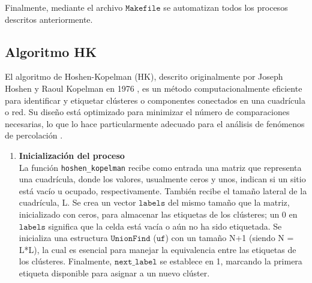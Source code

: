 \documentclass[12pt,a4paper]{article}
\begin{document}
Finalmente, mediante el archivo $\texttt{Makefile}$ se automatizan todos los procesos descritos anteriormente.

\subsection{Algoritmo HK}
El algoritmo de Hoshen-Kopelman (HK), descrito originalmente por Joseph Hoshen y Raoul Kopelman en 1976 , es un método computacionalmente eficiente para identificar y etiquetar clústeres o componentes conectados en una cuadrícula o red. Su diseño está optimizado para minimizar el número de comparaciones necesarias, lo que lo hace particularmente adecuado para el análisis de fenómenos de percolación \cite{OntosightAINd}.

\begin{enumerate}[label=\textbf{\arabic*)}, ref=\arabic*)]
    \item \textbf{Inicialización del proceso}\\
    La función \texttt{hoshen\_kopelman} recibe como entrada una matriz que representa una cuadrícula, donde los valores, usualmente ceros y unos, indican si un sitio está vacío u ocupado, respectivamente. También recibe el tamaño lateral de la cuadrícula, L. Se crea un vector $\texttt{labels}$ del mismo tamaño que la matriz, inicializado con ceros, para almacenar las etiquetas de los clústeres; un 0 en $\texttt{labels}$ significa que la celda está vacía o aún no ha sido etiquetada. Se inicializa una estructura $\texttt{UnionFind}$ ($\texttt{uf}$) con un tamaño N+1 (siendo N = L*L), la cual es esencial para manejar la equivalencia entre las etiquetas de los clústeres. Finalmente, $\texttt{next\_label}$ se establece en 1, marcando la primera etiqueta disponible para asignar a un nuevo clúster.
    

\end{enumerate}
\end{document}
